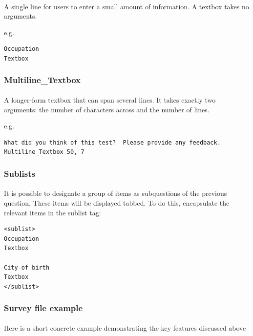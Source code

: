 \documentclass[12pt, oneside]{scrbook}   	%
\begin{document}
\paragraph{}
A single line for users to enter a small amount of information.  A textbox takes no arguments.

e.g.

\begin{lstlisting}
Occupation
Textbox
\end{lstlisting}

\subsubsection{Multiline\_Textbox}

\paragraph{}
A longer-form textbox that can span several lines.  It takes exactly two arguments: the number of characters across and the number of lines.

e.g.

\begin{lstlisting}
What did you think of this test?  Please provide any feedback.
Multiline_Textbox 50, 7
\end{lstlisting}

\subsubsection{Sublists}

\paragraph{}
It is possible to designate a group of items as subquestions of the previous question.  These items will be displayed tabbed.  To do this, encapsulate the relevant items in the sublist tag:

\begin{lstlisting}
<sublist>
Occupation
Textbox

City of birth
Textbox
</sublist>
\end{lstlisting}

\subsubsection{Survey file example}

\paragraph{}
Here is a short concrete example demonstrating the key features discussed above
\end{document}
